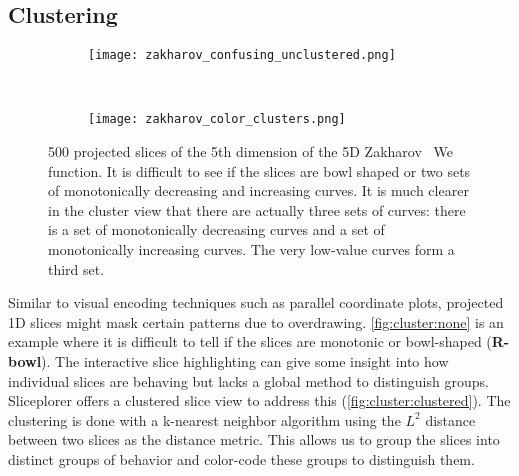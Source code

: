 \subsection{Clustering}

\begin{figure}
  \centering
  \begin{subfigure}[b]{0.48\columnwidth}
    \texttt{[image: zakharov\_confusing\_unclustered.png]}
    \caption{
    }
    \label{fig:cluster:none}
  \end{subfigure}
  ~
  \begin{subfigure}[b]{0.48\columnwidth}
    \texttt{[image: zakharov\_color\_clusters.png]}
    \caption{
    }
    \label{fig:cluster:clustered}
  \end{subfigure}
  \caption{
    500 projected slices of the 5th dimension of the 5D Zakharov~\cite{Back:1996} 
We    function. It is difficult to see if the slices are bowl shaped or two sets
    of monotonically decreasing and increasing curves. It is much clearer in 
    the cluster view that there are actually three sets of curves: 
    there is a set of monotonically decreasing curves and a set of 
    monotonically increasing curves. The very low-value curves form a third
    set.
  }
\end{figure}

Similar to visual encoding techniques such as parallel coordinate plots, projected 1D slices might mask certain patterns due to
overdrawing.
\autoref{fig:cluster:none} is an example where it is difficult to tell if the
slices are monotonic or bowl-shaped (\textbf{R-bowl}). The interactive slice highlighting
can give some insight into how individual slices are behaving but lacks
a global method to distinguish groups. Sliceplorer offers a
clustered slice view to address this (\autoref{fig:cluster:clustered}). 
The clustering is done with a k-nearest neighbor algorithm using the
$L^2$ distance between two slices as the distance metric.
This allows us to group the slices into distinct
groups of behavior and color-code these groups to distinguish them.


